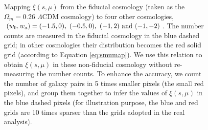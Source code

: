 \documentclass[iop]{emulateapj}
\begin{document}
\begin{figure}
   \caption{\label{fig_method}
 Mapping $\xi(s,\mu)$ from the fiducial cosmology (taken as the $\Omega_m=0.26$ $\Lambda$CDM cosmology) to four other cosmologies,
   $(w_0,w_a) = (-1.5,0),\ (-0.5,0),\ (-1,2)\ \rm and\ (-1,-2)$.
 The number counts are measured in the fiducial cosmology in the blue dashed grid;
 in other cosmologies their distribution becomes the red solid grid (according to Equation \ref{eq:smumap}).
 We use this relation to obtain $\xi(s,\mu)$ in these non-fiducial cosmology without re-measuring the number counts.
 To enhance the accuracy, we count the number of galaxy pairs in 5 times smaller pixels (the small red pixels), 
 and group them together to infer the values of $\xi(s, \mu)$ in the blue dashed pixels
 (for illustration purpose, the blue and red grids are 10 times sparser than the grids adopted in the real analysis).
}
\end{figure}
\end{document}
